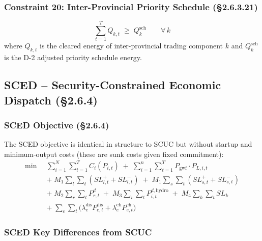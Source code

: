 \subsubsection{Constraint 20: Inter-Provincial Priority Schedule (§2.6.3.21)}\label{sec:scuc-priority}

\begin{equation}\label{eq:priority}
  \sum_{t=1}^{T} Q_{k,t} \;\geq\; Q^{\mathrm{sch}}_k
  \qquad \forall\, k
\end{equation}
where $Q_{k,t}$ is the cleared energy of inter-provincial trading component $k$
and $Q^{\mathrm{sch}}_k$ is the D-2 adjusted priority schedule energy.

\subsection{SCED -- Security-Constrained Economic Dispatch (§2.6.4)}
\label{sec:sced}

\subsubsection{SCED Objective (§2.6.4)}

The SCED objective is identical in structure to SCUC but without startup and
minimum-output costs (these are sunk costs given fixed commitment):
\begin{equation}\label{eq:sced-obj}
\begin{aligned}
\min \;\; & \sum_{i=1}^{N}\sum_{t=1}^{T} C_i(P_{i,t})
  \;+\; \sum_{i=1}^{n}\sum_{t=1}^{T} P_{\mathrm{gwf}} \cdot P_{L,i,t} \\
  &+\; M_1 \sum_{l}\sum_{t}(SL^{+}_{l,t}+SL^{-}_{l,t})
  \;+\; M_1 \sum_{s}\sum_{t}(SL^{+}_{s,t}+SL^{-}_{s,t}) \\
  &+\; M_2 \sum_{r}\sum_{t} P^{d}_{r,t}
  \;+\; M_3 \sum_{i}\sum_{t} P^{d,\mathrm{hydro}}_{i,t}
  \;+\; M_4 \sum_{k}\sum_{t} SL_k \\
  &+\; \sum_{e}\sum_{t}
    \bigl(\lambda^{\mathrm{dis}}_e P^{\mathrm{dis}}_{e,t}
    + \lambda^{\mathrm{ch}}_e P^{\mathrm{ch}}_{e,t}\bigr)
\end{aligned}
\end{equation}

\subsubsection{SCED Key Differences from SCUC}

